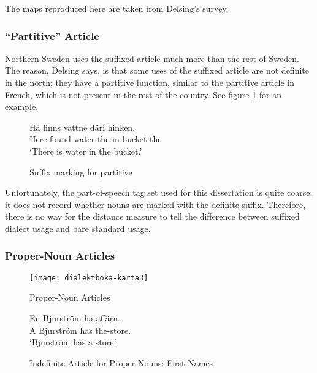 
The maps reproduced here are taken from Delsing's survey.

\subsubsection{``Partitive'' Article}

Northern Sweden uses the suffixed article much more than the rest of
Sweden. The reason, Delsing says, is that some uses of the suffixed
article are not definite in the north; they have a partitive function,
similar to the partitive article in French, which is not present in
the rest of the country. See figure \ref{partitive-article} for an
example.

\begin{figure}
  \gll H\"a finns vattne d\"ari hinken. \\
  Here found water-the in bucket-the \\
  \trans `There is water in the bucket.'
  \caption{Suffix marking for partitive}
  \label{partitive-article}
\end{figure}

Unfortunately, the part-of-speech tag set used for this dissertation
is quite coarse; it does not record whether nouns are marked with the
definite suffix. Therefore, there is no way for the distance measure
to tell the difference between suffixed dialect usage and bare
standard usage.

\subsubsection{Proper-Noun Articles}

\begin{figure}
  \texttt{[image: dialektboka-karta3]}
  \caption{Proper-Noun Articles}
  \label{indefinite-article-proper-noun-map}
\end{figure}

\begin{figure}
 \gll En Bjurstr\"om ha aff\"arn. \\
  A Bjurstr\"om has the-store. \\
  \trans `Bjurstr\"om has a store.'
  \caption{Indefinite Article for Proper Nouns: First Names}
  \label{indefinite-article-proper-noun}
\end{figure}

